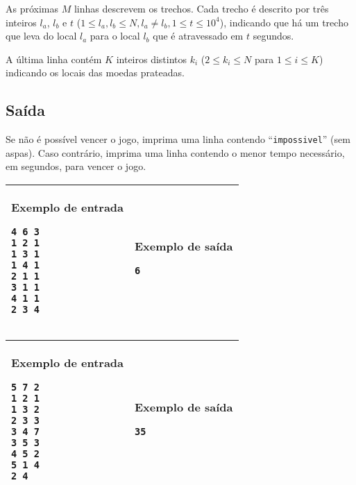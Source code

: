 As próximas $M$ linhas descrevem os trechos. Cada trecho é descrito por três
inteiros $l_a$, $l_b$ e $t$ ($1 \leq l_a, l_b \leq N, l_a \neq l_b, 1 \leq t
        \leq 10^4$), indicando que há um trecho que leva do local $l_a$ para o
local $l_b$ que é atravessado em $t$ segundos.

A última linha contém $K$ inteiros distintos $k_i$ ($2 \leq k_i \leq N$ para $1 \leq i \leq K$) indicando os locais das moedas prateadas.

\subsection*{Saída}

Se não é possível vencer o jogo, imprima uma linha contendo
``\verb|impossivel|'' (sem aspas). Caso
contrário, imprima uma linha contendo o menor tempo necessário, em segundos, para
vencer o jogo.

\clearpage
\begin{table}[!h]
\centering
\begin{tabular}{|l|l|}
\hline
\begin{minipage}[t]{3in}
\textbf{Exemplo de entrada}
\begin{verbatim}
4 6 3
1 2 1
1 3 1
1 4 1
2 1 1
3 1 1
4 1 1
2 3 4
\end{verbatim}
\vspace{1mm}
\end{minipage}
&

\begin{minipage}[t]{3in}
\textbf{Exemplo de saída}
\begin{verbatim}
6
\end{verbatim}
\vspace{1mm}
\end{minipage} \\
\hline
\end{tabular}
\end{table}

\begin{table}[!h]
\centering
\begin{tabular}{|l|l|}
\hline
\begin{minipage}[t]{3in}
\textbf{Exemplo de entrada}
\begin{verbatim}
5 7 2
1 2 1
1 3 2
2 3 3
3 4 7
3 5 3
4 5 2
5 1 4
2 4
\end{verbatim}
\vspace{1mm}
\end{minipage}
&

\begin{minipage}[t]{3in}
\textbf{Exemplo de saída}
\begin{verbatim}
35
\end{verbatim}
\vspace{1mm}
\end{minipage} \\
\hline
\end{tabular}
\end{table}

